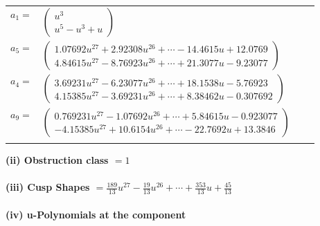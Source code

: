 \documentclass[1p]{elsarticle_modified}
\theoremstyle{definition}
\begin{document}
\begin{tabular}{m{7pt} m{180pt} m{7pt} m{180pt} }
\flushright $a_{1}=$&$\begin{pmatrix}u^3\\u^5- u^3+u\end{pmatrix}$ \\
\flushright $a_{5}=$&$\begin{pmatrix}1.07692 u^{27}+2.92308 u^{26}+\cdots-14.4615 u+12.0769\\4.84615 u^{27}-8.76923 u^{26}+\cdots+21.3077 u-9.23077\end{pmatrix}$ \\
\flushright $a_{4}=$&$\begin{pmatrix}3.69231 u^{27}-6.23077 u^{26}+\cdots+18.1538 u-5.76923\\4.15385 u^{27}-3.69231 u^{26}+\cdots+8.38462 u-0.307692\end{pmatrix}$ \\
\flushright $a_{9}=$&$\begin{pmatrix}0.769231 u^{27}-1.07692 u^{26}+\cdots+5.84615 u-0.923077\\-4.15385 u^{27}+10.6154 u^{26}+\cdots-22.7692 u+13.3846\end{pmatrix}$\\&\end{tabular}
\flushleft \textbf{(ii) Obstruction class $= 1$}\\~\\
\flushleft \textbf{(iii) Cusp Shapes $= \frac{189}{13} u^{27}-\frac{19}{13} u^{26}+\cdots+\frac{353}{13} u+\frac{45}{13}$}\\~\\
\newpage\renewcommand{\arraystretch}{1}
\flushleft \textbf{(iv) u-Polynomials at the component}\newline \\
\end{document}
